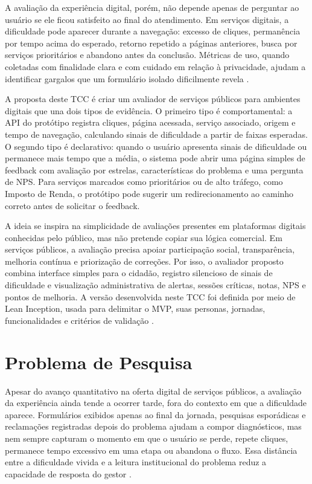 A avaliação da experiência digital, porém, não depende apenas de perguntar ao
usuário se ele ficou satisfeito ao final do atendimento. Em serviços digitais, a
dificuldade pode aparecer durante a navegação: excesso de cliques, permanência
por tempo acima do esperado, retorno repetido a páginas anteriores, busca por
serviços prioritários e abandono antes da conclusão. Métricas de uso, quando
coletadas com finalidade clara e com cuidado em relação à privacidade, ajudam a
identificar gargalos que um formulário isolado dificilmente revela
\cite{deloneMclean2003,govuk2021completionRate,brasil2018lgpd}.

A proposta deste TCC é criar um avaliador de serviços públicos para ambientes
digitais que una dois tipos de evidência. O primeiro tipo é comportamental: a API
do protótipo registra cliques, página acessada, serviço associado, origem e tempo
de navegação, calculando sinais de dificuldade a partir de faixas esperadas. O
segundo tipo é declarativo: quando o usuário apresenta sinais de dificuldade ou
permanece mais tempo que a média, o sistema pode abrir uma página simples de
feedback com avaliação por estrelas, características do problema e uma pergunta
de NPS. Para serviços marcados como prioritários ou de alto tráfego, como Imposto
de Renda, o protótipo pode sugerir um redirecionamento ao caminho correto antes
de solicitar o feedback.

A ideia se inspira na simplicidade de avaliações presentes em plataformas
digitais conhecidas pelo público, mas não pretende copiar sua lógica comercial.
Em serviços públicos, a avaliação precisa apoiar participação social,
transparência, melhoria contínua e priorização de correções. Por isso, o
avaliador proposto combina interface simples para o cidadão, registro silencioso
de sinais de dificuldade e visualização administrativa de alertas, sessões
críticas, notas, NPS e pontos de melhoria. A versão desenvolvida neste TCC foi
definida por meio de Lean Inception, usada para delimitar o MVP, suas personas,
jornadas, funcionalidades e critérios de validação
\cite{caroli2018leanInception,fowler2022leanInception}.

\section{Problema de Pesquisa}

Apesar do avanço quantitativo na oferta digital de serviços públicos, a avaliação
da experiência ainda tende a ocorrer tarde, fora do contexto em que a dificuldade
aparece. Formulários exibidos apenas ao final da jornada, pesquisas esporádicas e
reclamações registradas depois do problema ajudam a compor diagnósticos, mas nem
sempre capturam o momento em que o usuário se perde, repete cliques, permanece
tempo excessivo em uma etapa ou abandona o fluxo. Essa distância entre a
dificuldade vivida e a leitura institucional do problema reduz a capacidade de
resposta do gestor \cite{brasilMgi2024ppaParticipativo,govuk2021usingData}.

